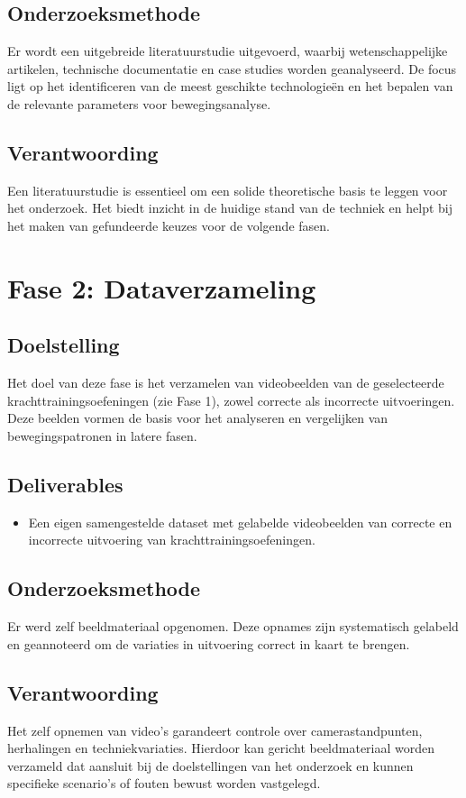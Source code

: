 \subsection{Onderzoeksmethode}
Er wordt een uitgebreide literatuurstudie uitgevoerd, waarbij wetenschappelijke artikelen, technische documentatie en case studies worden geanalyseerd. De focus ligt op het identificeren van de meest geschikte technologieën en het bepalen van de relevante parameters voor bewegingsanalyse.  

\subsection{Verantwoording}
Een literatuurstudie is essentieel om een solide theoretische basis te leggen voor het onderzoek. Het biedt inzicht in de huidige stand van de techniek en helpt bij het maken van gefundeerde keuzes voor de volgende fasen.  

\section{Fase 2: Dataverzameling}
\subsection{Doelstelling}
Het doel van deze fase is het verzamelen van videobeelden van de geselecteerde krachttrainingsoefeningen (zie Fase 1), zowel correcte als incorrecte uitvoeringen. 
Deze beelden vormen de basis voor het analyseren en vergelijken van bewegingspatronen in latere fasen.

\subsection{Deliverables}
\begin{itemize}
    \item Een eigen samengestelde dataset met gelabelde videobeelden van correcte en incorrecte uitvoering van krachttrainingsoefeningen.
\end{itemize}

\subsection{Onderzoeksmethode}
Er werd zelf beeldmateriaal opgenomen. Deze opnames zijn systematisch gelabeld en geannoteerd om de variaties in uitvoering correct in kaart te brengen.

\subsection{Verantwoording}
Het zelf opnemen van video’s garandeert controle over camerastandpunten, herhalingen en techniekvariaties. 
Hierdoor kan gericht beeldmateriaal worden verzameld dat aansluit bij de doelstellingen van het onderzoek en kunnen specifieke scenario’s of fouten bewust worden vastgelegd.


